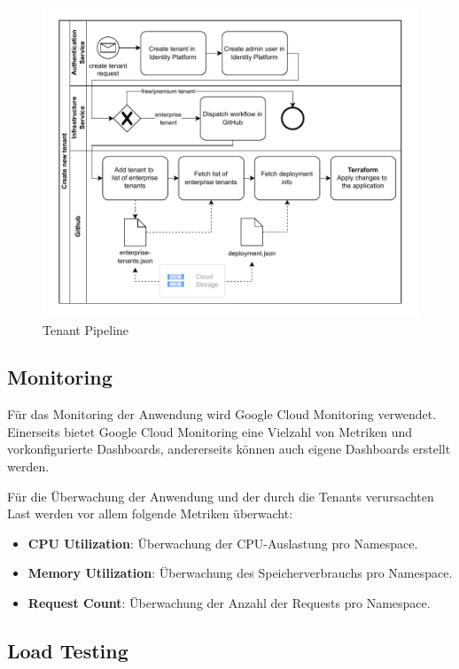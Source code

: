 \begin{figure}[H]
  \centering
  \includegraphics[width=\textwidth]{resources/tenant-pipeline.pdf}
  \caption{Tenant Pipeline}
  \label{fig:tenant-pipeline}
\end{figure}

\subsection{Monitoring}

Für das Monitoring der Anwendung wird Google Cloud Monitoring verwendet.
Einerseits bietet Google Cloud Monitoring eine Vielzahl von Metriken und vorkonfigurierte Dashboards,
andererseits können auch eigene Dashboards erstellt werden.

Für die Überwachung der Anwendung und der durch die Tenants verursachten Last werden 
vor allem folgende Metriken überwacht:

\begin{itemize}
  \item \textbf{CPU Utilization}: Überwachung der CPU-Auslastung pro Namespace.
  \item \textbf{Memory Utilization}: Überwachung des Speicherverbrauchs pro Namespace.
  \item \textbf{Request Count}: Überwachung der Anzahl der Requests pro Namespace.
\end{itemize}


\subsection{Load Testing}